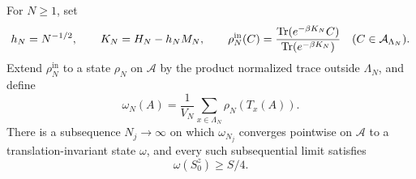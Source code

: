 \begin{proposition}\label{prop:magnetized-limit}
For \(N\geq1\), set
\[
 h_N=N^{-1/2},\qquad K_N=H_N-h_NM_N,
 \qquad
 \rho_N^{\mathrm{in}}(C)=
   \frac{\operatorname{Tr}(e^{-\beta K_N}C)}{\operatorname{Tr}(e^{-\beta K_N})}
 \quad(C\in\mathcal A_{\Lambda_N}).
\]
Extend \(\rho_N^{\mathrm{in}}\) to a state \(\rho_N\) on
\(\mathcal A\) by the product normalized trace outside \(\Lambda_N\),
and define
\begin{equation}\label{eq:translation-average}
 \omega_N(A)=\frac1{V_N}\sum_{x\in\Lambda_N}\rho_N(T_x(A)).
\end{equation}
There is a subsequence \(N_j\to\infty\) on which \(\omega_{N_j}\)
converges pointwise on \(\mathcal A\) to a translation-invariant state
\(\omega\), and every such subsequential limit satisfies
\begin{equation}\label{eq:positive-limit-magnetization}
 \omega(S_0^z)\geq S/4.
\end{equation}
\end{proposition}

